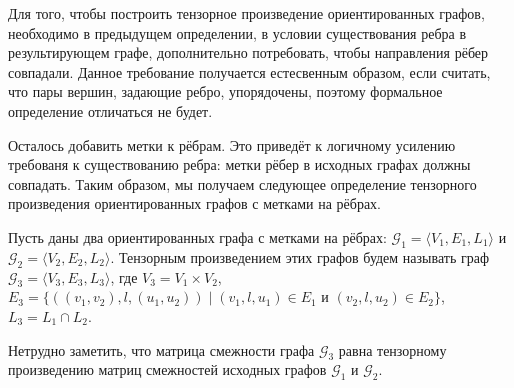 Для того, чтобы построить тензорное произведение ориентированных графов, необходимо в предыдущем определении, в условии существования ребра в результирующем графе, дополнительно потребовать, чтобы направления рёбер совпадали.
Данное требование получается естесвенным образом, если считать, что пары вершин, задающие ребро, упорядочены, поэтому формальное определение отличаться не будет.

Осталось добавить метки к рёбрам.
Это приведёт к логичному усилению требованя к существованию ребра: метки рёбер в исходных графах должны совпадать.
Таким образом, мы получаем следующее определение тензорного произведения ориентированных графов с метками на рёбрах.

\begin{definition}
Пусть даны два ориентированных графа с метками на рёбрах: $\mathcal{G}_1 = \langle V_1, E_1, L_1 \rangle$ и $\mathcal{G}_2 = \langle V_2, E_2, L_2 \rangle$.
Тензорным произведением этих графов будем называть граф $\mathcal{G}_3 = \langle V_3, E_3, L_3\rangle$, где $V_3 = V_1 \times V_2$, $E_3 = \{ ((v_1,v_2),l,(u_1,u_2)) \mid (v_1,l,u_1) \in E_1 \text{ и } (v_2,l,u_2) \in E_2 \}$, $L_3=L_1 \cap L_2$.
\end{definition}

Нетрудно заметить, что матрица смежности графа $\mathcal{G}_3$ равна тензорному произведению матриц смежностей исходных графов $\mathcal{G}_1$ и $\mathcal{G}_2$.

